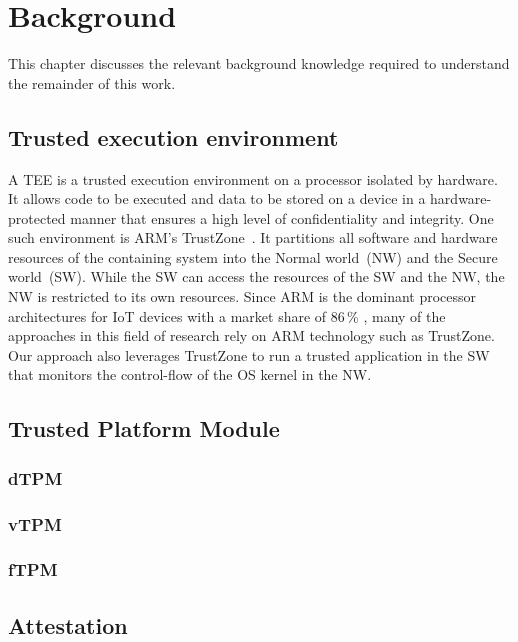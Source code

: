 
\chapter{Background}\label{chapter:background}

This chapter discusses the relevant background knowledge required to understand the remainder of this work.

\section{Trusted execution environment}
A \ac{TEE} is a trusted execution environment on a processor isolated by hardware.
It allows code to be executed and data to be stored on a device in a hardware-protected manner that ensures a high level of confidentiality and integrity. One such environment is ARM's TrustZone~\cite{ARM09}. It partitions all software and hardware resources of the containing system into the Normal world~(NW) and the Secure world~(SW). While the SW can access the resources of the SW and the NW, the NW is restricted to its own resources.
Since ARM is the dominant processor architectures for IoT devices with a market share of 86\,\% \cite{eclipse}, many of the approaches in this field of research rely on ARM technology such as TrustZone. Our approach also leverages TrustZone to run a trusted application in the SW that monitors the control-flow of the OS kernel in the NW.



\section{Trusted Platform Module}
\subsection{dTPM}
\subsection{vTPM}
\subsection{fTPM}

\section{Attestation}
